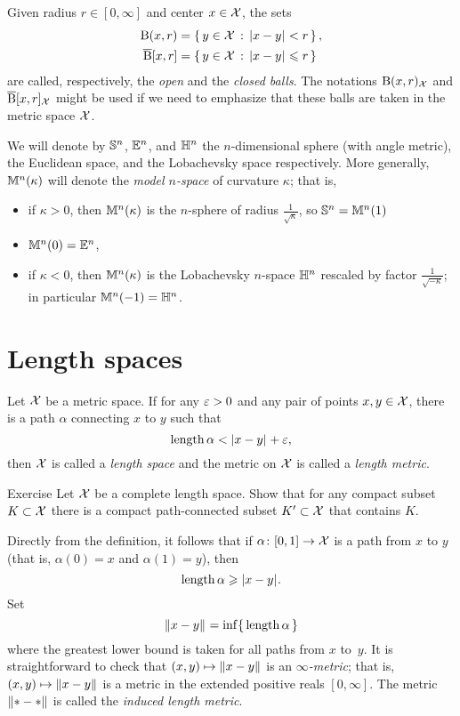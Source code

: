 Given radius $r\in[0,\infty]$ and center $x\in \mathcal{X}$, the sets
\begin{align*}
\mathrm{B}{}(x,r)&=\left\{\,{y\in \mathcal{X}}\,:\,{|{x}-{y}|_{}^{{}}<r}\,\right\},
\\
\overline{\mathrm{B}}{}[x,r]&=\left\{\,{y\in \mathcal{X}}\,:\,{|{x}-{y}|_{}^{{}}\leqslant r}\,\right\}
\end{align*}
are called, respectively, the \emph{open} and  the \emph{closed  balls}.
The notations $\mathrm{B}{}(x,r)_{\mathcal{X}}$ and $\overline{\mathrm{B}}{}[x,r]_{\mathcal{X}}$
might be used if we need to emphasize that these balls are taken in the metric space $\mathcal{X}$.

We will denote by $\mathbb{S}^n$, $\mathbb{E}^n$, and $\mathbb{H}^n$ the $n$-dimensional sphere (with angle metric), 
the Euclidean space, and the Lobachevsky space respectively.
More generally, $\mathbb{M}^n(\kappa)$ will denote the \emph{model $n$-space} of curvature $\kappa$;
that is,
\begin{itemize}
\item if $\kappa>0$, then $\mathbb{M}^n(\kappa)$ is the $n$-sphere of radius $\tfrac{1}{\sqrt{\kappa}}$, so $\mathbb{S}^n=\mathbb{M}^n(1)$
\item $\mathbb{M}^n(0)=\mathbb{E}^n$,
\item if $\kappa<0$, then $\mathbb{M}^n(\kappa)$ is the Lobachevsky $n$-space $\mathbb{H}^n$ rescaled by factor $\tfrac{1}{\sqrt{-\kappa}}$;
in particular $\mathbb{M}^n(-1)=\mathbb{H}^n$.
\end{itemize}

\section{Length spaces}\label{sec:length}

Let $\mathcal{X}$ be a metric space.
If for any $\varepsilon>0$ and any pair of points $x,y\in\mathcal{X}$, there is a path $\alpha$ connecting $x$ to $y$ such that
\[\mathop{\rm length}\nolimits\alpha< |{x}-{y}|_{}^{{}}+\varepsilon,\]
then $\mathcal{X}$ is called a \emph{length space} and the metric on $\mathcal{X}$ is called a \emph{length metric}.\label{page:length metric}

\begin{thm}{Exercise}\label{ex:compact+connceted}
Let $\mathcal{X}$ be a complete length space.
Show that for any compact subset $K\subset\mathcal{X}$
there is a compact path-connected subset $K'\subset\mathcal{X}$ that contains $K$.  
\end{thm}

Directly from the definition, it follows that if $\alpha\colon[0,1]\to\mathcal{X}$ is a path from $x$ to $y$ 
(that is, $\alpha(0)=x$ and $\alpha(1)=y$), then 
\[\mathop{\rm length}\nolimits\alpha\geqslant |{x}-{y}|_{}^{{}}.\]
Set 
\[\|{x}-{y}\|_{}^{{}}=\inf\{\,\mathop{\rm length}\nolimits\alpha\,\}\]
where the greatest lower bound is taken for all paths from $x$ to~$y$.
It is straightforward to check that $(x,y)\mapsto \|{x}-{y}\|_{}^{{}}$ is an \emph{$\infty$-metric};
that is, $(x,y)\mapsto \|{x}-{y}\|_{}^{{}}$ is a metric in the extended positive reals $[0,\infty]$. 
The metric $\|{*}-{*}\|_{}^{{}}$ is called the \emph{induced length metric}.

